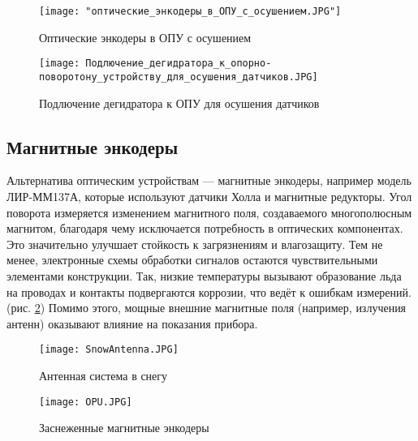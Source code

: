 \begin{figure}[htbp]
    \centering
    \begin{minipage}{0.48\linewidth}
       \texttt{[image: "оптические\_энкодеры\_в\_ОПУ\_с\_осушением.JPG"]} 
        \caption{Оптические энкодеры в ОПУ с осушением}
        \label{Degidrator1} 
    \end{minipage}\hfill
    \begin{minipage}{0.48\linewidth}
       \centering
        \texttt{[image: Подлючение\_дегидратора\_к\_опорно-поворотону\_устройству\_для\_осушения\_датчиков.JPG]} 
        \caption{Подлючение дегидратора к ОПУ для осушения датчиков}
      \label{Degidrator2}
    \end{minipage}
\end{figure}

\FloatBarrier
 \subsection{Магнитные энкодеры}
  
  Альтернатива оптическим устройствам — магнитные энкодеры, например модель ЛИР-ММ137А, 
  которые используют датчики Холла и магнитные редукторы. Угол поворота измеряется изменением магнитного поля, создаваемого многополюсным магнитом, 
  благодаря чему исключается потребность в оптических компонентах. 
  Это значительно улучшает стойкость к загрязнениям и влагозащиту. 
  Тем не менее, электронные схемы обработки сигналов остаются чувствительными элементами конструкции. 
  Так, низкие температуры вызывают образование льда на проводах и контакты подвергаются коррозии, что ведёт к ошибкам измерений.(рис. \ref{OpuInSnow}) 
  Помимо этого, мощные внешние магнитные поля (например, излучения антенн) оказывают влияние на показания прибора.



  \begin{figure}[htbp]
    \centering
    \begin{minipage}{0.48\linewidth}%
        \centering
    \texttt{[image: SnowAntenna.JPG]}
    \caption{Антенная система в снегу}
    \label{SnowAntenna}
    \end{minipage}\hfill%
    \begin{minipage}{0.48\linewidth}%
       \centering
    \texttt{[image: OPU.JPG]}
    \caption{Заснеженные магнитные энкодеры}
    \label{OpuInSnow}
    \end{minipage}
\end{figure}

